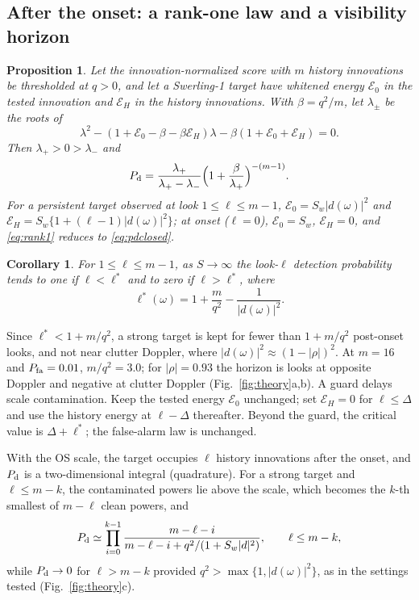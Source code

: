 \documentclass[journal]{IEEEtran}
\newtheorem{proposition}{Proposition}
\newtheorem{corollary}{Corollary}
\begin{document}
\subsection{After the onset: a rank-one law and a visibility horizon}
\begin{proposition}\label{prop:rank1}
Let the innovation-normalized score with $m$ history innovations be thresholded at $q>0$, and let a Swerling-1 target have whitened energy $\mathcal E_0$ in the tested innovation and $\mathcal E_H$ in the history innovations. With $\beta=q^2/m$, let $\lambda_\pm$ be the roots of
\[
\lambda^2-(1+\mathcal E_0-\beta-\beta\mathcal E_H)\lambda-\beta(1+\mathcal E_0+\mathcal E_H)=0 .
\]
Then $\lambda_+>0>\lambda_-$ and
\begin{equation}
P_{\rm d}=\frac{\lambda_+}{\lambda_+-\lambda_-}\Big(1+\frac{\beta}{\lambda_+}\Big)^{-(m-1)}.
\label{eq:rank1}
\end{equation}
For a persistent target observed at look $1\le\ell\le m-1$, $\mathcal E_0=S_w|d(\omega)|^2$ and $\mathcal E_H=S_w\{1+(\ell-1)|d(\omega)|^2\}$; at onset ($\ell=0$), $\mathcal E_0=S_w$, $\mathcal E_H=0$, and \eqref{eq:rank1} reduces to \eqref{eq:pdclosed}.
\end{proposition}
\begin{corollary}\label{cor:horizon}
For $1\le\ell\le m-1$, as $S\to\infty$ the look-$\ell$ detection probability tends to one if $\ell<\ell^*$ and to zero if $\ell>\ell^*$, where
\begin{equation}
\ell^*(\omega)=1+\frac{m}{q^2}-\frac{1}{|d(\omega)|^2}.
\label{eq:horizon}
\end{equation}
\end{corollary}
Since $\ell^*<1+m/q^2$, a strong target is kept for fewer than $1+m/q^2$ post-onset looks, and not near clutter Doppler, where $|d(\omega)|^2\approx(1-|\rho|)^2$. At $m=16$ and $P_{\rm fa}=0.01$, $m/q^2=3.0$; for $|\rho|=0.93$ the horizon is \ThHorizonOpp{} looks at opposite Doppler and negative at clutter Doppler (Fig.~\ref{fig:theory}a,b). A guard delays scale contamination. Keep the tested energy $\mathcal E_0$ unchanged; set $\mathcal E_H=0$ for $\ell\le\Delta$ and use the history energy at $\ell-\Delta$ thereafter. Beyond the guard, the critical value is $\Delta+\ell^*$; the false-alarm law is unchanged.

With the OS scale, the target occupies $\ell$ history innovations after the onset, and $P_{\rm d}$ is a two-dimensional integral (quadrature). For a strong target and $\ell\le m-k$, the contaminated powers lie above the scale, which becomes the $k$-th smallest of $m-\ell$ clean powers, and
\begin{equation}
P_{\rm d}\simeq\prod_{i=0}^{k-1}\frac{m-\ell-i}{m-\ell-i+q^2/(1+S_w|d|^2)},\qquad \ell\le m-k,
\label{eq:osstrong}
\end{equation}
while $P_{\rm d}\to0$ for $\ell>m-k$ provided $q^2>\max\{1,|d(\omega)|^2\}$, as in the settings tested (Fig.~\ref{fig:theory}c).
\end{document}
